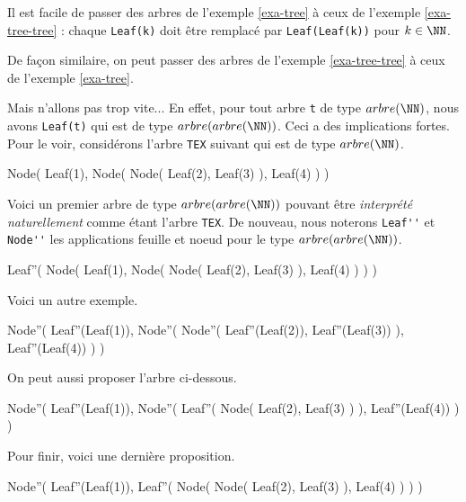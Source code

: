 Il est facile de passer des arbres de l'exemple \ref{exa-tree} à ceux de l'exemple \ref{exa-tree-tree} : chaque \verb+Leaf(k)+ doit être remplacé par \verb+Leaf(Leaf(k))+ pour $k \in \NN$.

\medskip

De façon similaire, on peut passer des arbres de l'exemple \ref{exa-tree-tree} à ceux de l'exemple \ref{exa-tree}.

\medskip

Mais n'allons pas trop vite... En effet, pour tout arbre \verb+t+ de type $arbre(\NN)$, nous avons \verb+Leaf(t)+ qui est de type $arbre(arbre(\NN))$. Ceci a des implications fortes. Pour le voir, considérons l'arbre \verb+TEX+ suivant qui est de type $arbre(\NN)$.

\begin{pseudocode}
Node(
	Leaf(1), 
	Node(
		Node(
			Leaf(2),
			Leaf(3)
		), 
		Leaf(4)
	)
)
\end{pseudocode}

	
Voici un premier arbre de type $arbre(arbre(\NN))$ pouvant être \emph{\og interprété naturellement \fg} comme étant l'arbre \verb+TEX+. De nouveau, nous noterons \verb+Leaf''+ et \verb+Node''+ les applications feuille et noeud pour le type $arbre(arbre(\NN))$.

\begin{pseudocode}
Leaf''(
	Node(
		Leaf(1), 
		Node(
			Node(
				Leaf(2),
				Leaf(3)
			), 
			Leaf(4)
		)
	)
)
\end{pseudocode}


Voici un autre exemple.

\begin{pseudocode}
Node''(
	Leaf''(Leaf(1)), 
	Node''(
		Node''(
			Leaf''(Leaf(2)),
			Leaf''(Leaf(3))
		), 
		Leaf''(Leaf(4))
	)
)
\end{pseudocode}


On peut aussi proposer l'arbre ci-dessous.

\begin{pseudocode}
Node''(
	Leaf''(Leaf(1)), 
	Node''(
		Leaf''(
			Node(
				Leaf(2),
				Leaf(3)
			)
		), 
		Leaf''(Leaf(4))
	)
)
\end{pseudocode}


Pour finir, voici une dernière proposition.

\begin{pseudocode}
Node''(
	Leaf''(Leaf(1)), 
	Leaf''(
		Node(
			Node(
				Leaf(2),
				Leaf(3)
			), 
			Leaf(4)
		)
	)
)
\end{pseudocode}






